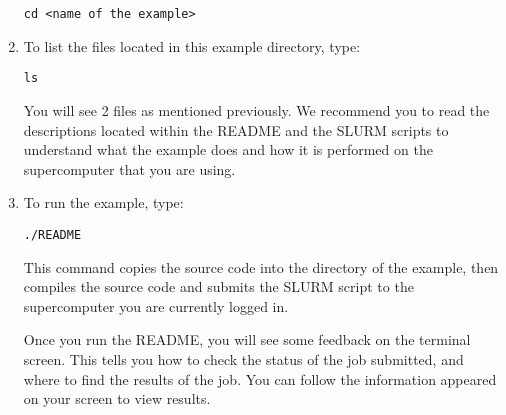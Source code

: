 \begin{enumerate}
\begin{tcolorbox}
\begin{Verbatim}[fontsize=\small]
cd <name of the example>
\end{Verbatim}
\end{tcolorbox}
\item To list the files located in this example directory, type: 
\begin{tcolorbox}
\begin{Verbatim}[fontsize=\small]
ls
\end{Verbatim}
\end{tcolorbox}
You will see 2 files as mentioned previously. We recommend you to read the descriptions located within the README and the SLURM scripts to understand 
what the example does and how it is performed on the supercomputer that you are using.
\item To run the example, type: 
\begin{tcolorbox}
\begin{Verbatim}[fontsize=\small]
./README
\end{Verbatim}
\end{tcolorbox}
This command copies the source code into the directory of the example, then compiles the source code and submits the SLURM script to the supercomputer
you are currently logged in.

Once you run the README, you will see some feedback on the terminal screen. This tells you how to check the status of the job submitted, and where to
find the results of the job. You can follow the information appeared on your screen to view results. 
\end{enumerate}


